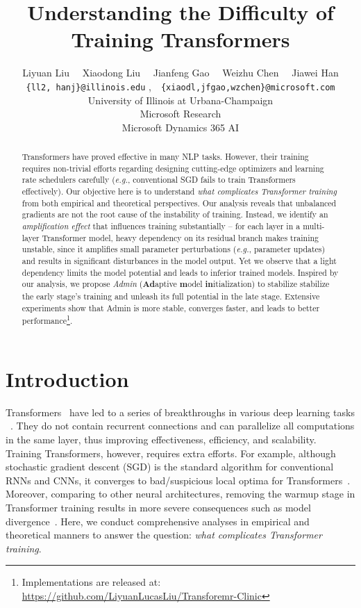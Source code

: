 \documentclass[11pt,a4paper]{article}
\title{Understanding the Difficulty of Training Transformers}
\author{
Liyuan Liu\textsuperscript{}~~
Xiaodong Liu\textsuperscript{}~~
Jianfeng Gao\textsuperscript{}~~
Weizhu Chen\textsuperscript{}~~
Jiawei Han\textsuperscript{}\\
\texttt{\small \{ll2, hanj\}@illinois.edu}
,~~\texttt{\small \{xiaodl,jfgao,wzchen\}@microsoft.com}
\\
\textsuperscript{}{University of Illinois at Urbana-Champaign} \\ \textsuperscript{}Microsoft Research \\ \textsuperscript{} Microsoft Dynamics 365 AI
}
\date{}
\newcommand{\our}{\mbox{Admin}\xspace}
\newcommand{\eg}{\textit{e.g.}}
\begin{document}
\maketitle



\begin{abstract}
  


Transformers have proved effective in many NLP tasks.
However, their training requires non-trivial efforts regarding  designing cutting-edge optimizers and learning rate schedulers carefully (\eg, conventional SGD fails to train Transformers effectively). 
Our objective here is to understand \emph{what complicates Transformer training} from both empirical and theoretical perspectives. 
Our analysis reveals that unbalanced gradients are not the root cause of the instability of training. 
Instead, we identify an \emph{amplification effect} that influences training substantially -- 
for each layer in a multi-layer Transformer model, 
heavy dependency on its residual branch makes training unstable, since it amplifies small parameter perturbations (\eg, parameter updates)
and results in significant disturbances in the model output.
Yet we observe that a light dependency limits the model potential and leads to inferior trained models. 
Inspired by our analysis, we propose \emph{\our} (\textbf{Ad}aptive \textbf{m}odel \textbf{in}itialization) to stabilize stabilize the early stage's training and unleash its full potential in the late stage. 
Extensive experiments show that \our is more stable, converges faster, and leads to better performance\footnote{Implementations are released at: \url{https://github.com/LiyuanLucasLiu/Transforemr-Clinic}}. 
 \end{abstract}



\section{Introduction}

Transformers~\cite{Vaswani2017AttentionIA} have led to a series of breakthroughs in various deep learning tasks ~\cite{Devlin2019BERTPO,Velickovic2017GraphAN}. 
They do not contain recurrent connections and can parallelize all computations in the same layer, thus improving effectiveness, efficiency, and scalability.
Training Transformers, however, requires extra efforts.
For example, although stochastic gradient descent (SGD)
is the standard algorithm for conventional RNNs and CNNs, it converges to bad/suspicious local optima for Transformers~\cite{Zhang2019WhyAB}.
Moreover, comparing to other neural architectures, removing the warmup stage in Transformer training results in more severe consequences such as model divergence~\cite{Popel2018TrainingTF,Liu2019OnTV}.
Here, we conduct comprehensive analyses in empirical and theoretical manners to answer the question: \textit{what complicates Transformer training}.
\end{document}
